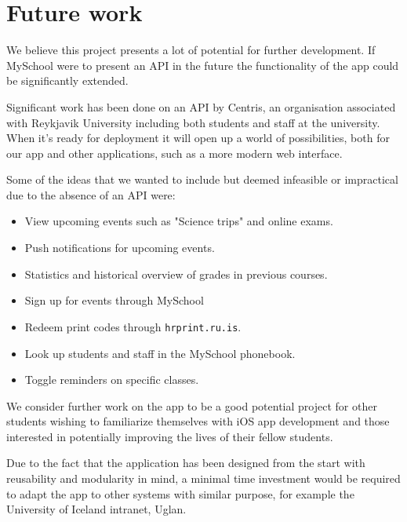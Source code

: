\documentclass[pdftex, DIV=calc, paper=a4, fontsize=11pt]{scrartcl}	 %
\begin{document}

\section{Future work}
\label{sec:future}

We believe this project presents a lot of potential for further development. If MySchool were to
present an API in the future the functionality of the app could be significantly extended.

Significant work has been done on an API by Centris\cite{centris}, an organisation associated with
Reykjavik University including both students and staff at the university. When it's ready for deployment it will open
up a world of possibilities, both for our app and other applications, such as a more modern web 
interface.

Some of the ideas that we wanted to include but deemed infeasible or impractical due to the absence
of an API were:

\begin{itemize}
    \item View upcoming events such as "Science trips" and online exams.
    \item Push notifications for upcoming events.
    \item Statistics and historical overview of grades in previous courses.
    \item Sign up for events through MySchool
    \item Redeem print codes through \texttt{hrprint.ru.is}.
    \item Look up students and staff in the MySchool phonebook.
    \item Toggle reminders on specific classes.
\end{itemize}

We consider further work on the app to be a good potential project for other students wishing to 
familiarize themselves with iOS app development and those interested in potentially improving the
lives of their fellow students. 

Due to the fact that the application has been designed from the start with reusability and modularity
in mind, a minimal time investment would be required to adapt the app to other systems with similar
purpose, for example the University of Iceland intranet, Uglan\cite{uglan}.
\end{document}

